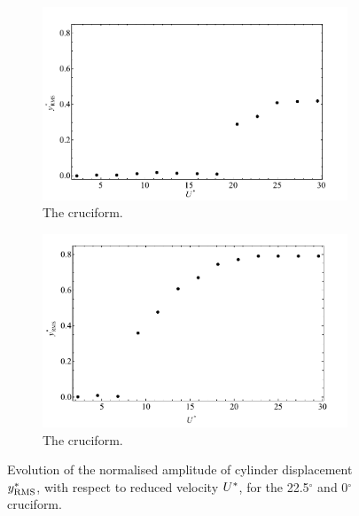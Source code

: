 \documentclass[oneside]{utmthesis}
\begin{document}
\begin{figure}
  \centering
  \begin{subfigure}[h]{1\textwidth}
    \includegraphics[width=\textwidth]{figs/yStrRMS4}
  \caption{The \angtw{} cruciform.}
    \label{fig:yStrRMS4}
  \end{subfigure}
  
  \begin{subfigure}[h]{1\textwidth}
    \includegraphics[width=\textwidth]{figs/yStrRMS5}
    \caption{The \angon{} cruciform.}
    \label{fig:yStrRMS5}
  \end{subfigure}

  \caption{Evolution of the normalised \rms{} amplitude of cylinder displacement $y^{*}_{\text{RMS}}$, with respect to reduced velocity $U^{*}$, for the 22.5$^{\circ}$ and 0$^{\circ}$ cruciform.}
  \label{fig:yStrRMS45}
\end{figure}
\end{document}
